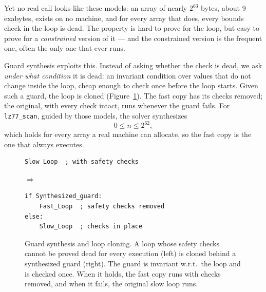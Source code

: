 \documentclass[acmsmall,screen,nonacm]{acmart}
\begin{document}
Yet no real call looks like these models: an array of nearly $2^{63}$
bytes, about 9 exabytes, exists on no machine, and for every array that
does, every bounds check in the loop is dead. The property is hard to prove for the loop, but easy to prove
for a \emph{constrained} version of it --- and the constrained version is
the frequent one, often the only one that ever runs.

Guard synthesis exploits this. Instead of asking whether the check is
dead, we ask \emph{under what condition} it is dead: an invariant condition over
values that do not change inside the loop, cheap enough to check once
before the loop starts. Given such a guard, the loop is cloned
(Figure~\ref{fig:guard}). The fast copy has its checks removed; the
original, with every check intact, runs whenever the guard fails. For
\texttt{lz77\_scan}, guided by those models, the solver synthesizes
\[
0 \le n \le 2^{62},
\]
which holds for every array a real machine can allocate, so the fast
copy is the one that always executes.

\begin{figure}[t]
\centering
\begin{minipage}[c]{0.40\linewidth}
\begin{lstlisting}[style=odessy,comment={[l]{;}}]
Slow_Loop  ; with safety checks
\end{lstlisting}
\end{minipage}\hfill$\Longrightarrow$\hfill
\begin{minipage}[c]{0.50\linewidth}
\begin{lstlisting}[style=odessy,morekeywords={if,else},comment={[l]{;}}]
if Synthesized_guard:
    Fast_Loop  ; safety checks removed
else:
    Slow_Loop  ; checks in place
\end{lstlisting}
\end{minipage}
\caption{Guard synthesis and loop cloning. A loop whose safety checks
cannot be proved dead for every execution (left) is cloned behind a
synthesized guard (right). The guard is invariant w.r.t.\ the loop and is checked once.
When it holds, the fast copy runs with checks removed, and when
it fails, the original slow loop runs.}
\label{fig:guard}
\end{figure}
\end{document}

